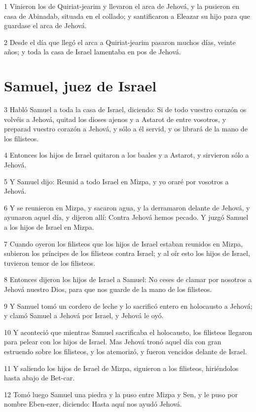 \par 1 Vinieron los de Quiriat-jearim y llevaron el arca de Jehová, y la pusieron en casa de Abinadab, situada en el collado; y santificaron a Eleazar su hijo para que guardase el arca de Jehová. 
\par 2 Desde el día que llegó el arca a Quiriat-jearim pasaron muchos días, veinte años; y toda la casa de Israel lamentaba en pos de Jehová.

\section*{Samuel, juez de Israel }

\par 3 Habló Samuel a toda la casa de Israel, diciendo: Si de todo vuestro corazón os volvéis a Jehová, quitad los dioses ajenos y a Astarot de entre vosotros, y preparad vuestro corazón a Jehová, y sólo a él servid, y os librará de la mano de los filisteos.
\par 4 Entonces los hijos de Israel quitaron a los baales y a Astarot, y sirvieron sólo a Jehová.
\par 5 Y Samuel dijo: Reunid a todo Israel en Mizpa, y yo oraré por vosotros a Jehová.
\par 6 Y se reunieron en Mizpa, y sacaron agua, y la derramaron delante de Jehová, y ayunaron aquel día, y dijeron allí: Contra Jehová hemos pecado. Y juzgó Samuel a los hijos de Israel en Mizpa.
\par 7 Cuando oyeron los filisteos que los hijos de Israel estaban reunidos en Mizpa, subieron los príncipes de los filisteos contra Israel; y al oír esto los hijos de Israel, tuvieron temor de los filisteos.
\par 8 Entonces dijeron los hijos de Israel a Samuel: No ceses de clamar por nosotros a Jehová nuestro Dios, para que nos guarde de la mano de los filisteos.
\par 9 Y Samuel tomó un cordero de leche y lo sacrificó entero en holocausto a Jehová; y clamó Samuel a Jehová por Israel, y Jehová le oyó.
\par 10 Y aconteció que mientras Samuel sacrificaba el holocausto, los filisteos llegaron para pelear con los hijos de Israel. Mas Jehová tronó aquel día con gran estruendo sobre los filisteos, y los atemorizó, y fueron vencidos delante de Israel.
\par 11 Y saliendo los hijos de Israel de Mizpa, siguieron a los filisteos, hiriéndolos hasta abajo de Bet-car.
\par 12 Tomó luego Samuel una piedra y la puso entre Mizpa y Sen, y le puso por nombre Eben-ezer, diciendo: Hasta aquí nos ayudó Jehová. 
